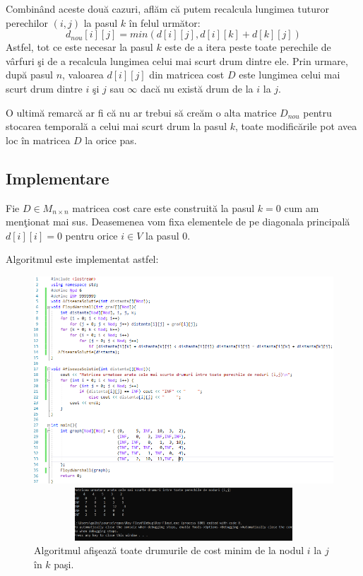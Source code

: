 \documentclass[11pt,a4paper]{report}
\begin{document}
	Combin\^and aceste dou\u a cazuri, afl\u am c\u a putem recalcula lungimea tuturor perechilor $(i,j)$ la pasul $k$ \^ in felul urm\u ator:
	 \begin{equation*}
	d_{nou}[i][j]=min(d[i][j],d[i][k]+d[k][j])
	\end{equation*}	
	Astfel, tot ce este necesar la pasul $k$ este de a itera peste toate perechile de v\^ arfuri \c si de a recalcula lungimea celui mai scurt drum dintre ele. Prin urmare, dup\u a pasul $n$, valoarea $d[i][j]$ din matricea cost $D$ este lungimea celui mai scurt drum dintre $i$ \c si $j$ sau $\infty$ dac\u a  nu exist\u a drum de la $i$ la $j$.


	O ultim\u a remarc\u a ar fi c\u a nu ar trebui s\u a cre\u am o alta matrice $D_{nou}$ pentru stocarea temporal\u a a celui mai scurt drum la pasul $k$, toate modific\u arile pot avea loc \^ in matricea $D$ la orice pas.
     \subsection{Implementare}
     
     Fie $D\in M_{n\times n}$ matricea cost care este construit\u a la pasul $k=0$ cum am men\c tionat mai sus. Deasemenea vom fixa elementele de pe diagonala principal\u a $d[i][i]=0$ pentru orice $i\in V$ la pasul 0.
     
     Algoritmul este implementat astfel:
     \begin{figure}[!hbt]
     	\centering
     	\includegraphics[width=12cm]{RoyFloysAlg.png}

     	\includegraphics[width=12cm,height=2cm]{RFoutput.png}
     	\caption{Algoritmul afi\c seaz\u a toate drumurile de cost minim de la nodul $i$ la $j$ \^ in $k$ pa\c si.}
     \end{figure}
 
\end{document}
